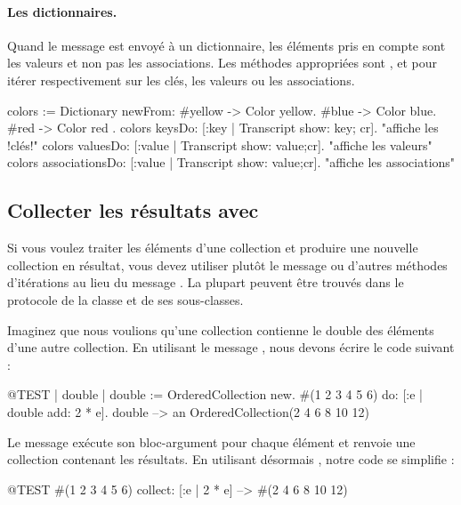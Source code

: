 \documentclass[a4paper,10pt,twoside]{book}
\begin{document}
\paragraph{Les dictionnaires.}
Quand le message  est envoyé à un dictionnaire,
les éléments pris en compte sont les valeurs et non pas les associations.
Les méthodes appropriées sont ,  et  pour itérer respectivement sur les clés, les valeurs ou les associations.

\begin{code}{}
colors := Dictionary newFrom: { #yellow -> Color yellow. #blue -> Color blue. #red -> Color red }.
colors keysDo: [:key | Transcript show: key; cr].                    "affiche les !clés!"
colors valuesDo: [:value | Transcript show: value;cr].            "affiche les valeurs"
colors associationsDo: [:value | Transcript show: value;cr].  "affiche les associations"
\end{code}

\subsection{Collecter les résultats avec }
Si vous voulez traiter les éléments d'une collection et produire
une nouvelle collection en résultat, vous devez utiliser plutôt le
message  ou d'autres méthodes d'itérations au lieu
du message .
La plupart peuvent être trouvés dans le protocole  
de la classe  et de ses sous-classes.

Imaginez que nous voulions qu'une collection contienne le double des éléments d'une autre collection. 
En utilisant le message , nous devons écrire le code suivant :

\begin{code}{@TEST | double |}
double := OrderedCollection new.
#(1 2 3 4 5 6) do: [:e | double add: 2 * e].
double --> an OrderedCollection(2 4 6 8 10 12)
\end{code}

\noindent
Le message  exécute son bloc-argument
pour chaque élément et renvoie une collection contenant les résultats.
En utilisant désormais , notre code se simplifie :
\begin{code}{@TEST}
#(1 2 3 4 5 6) collect: [:e | 2 * e] --> #(2 4 6 8 10 12)
\end{code}
\end{document}
